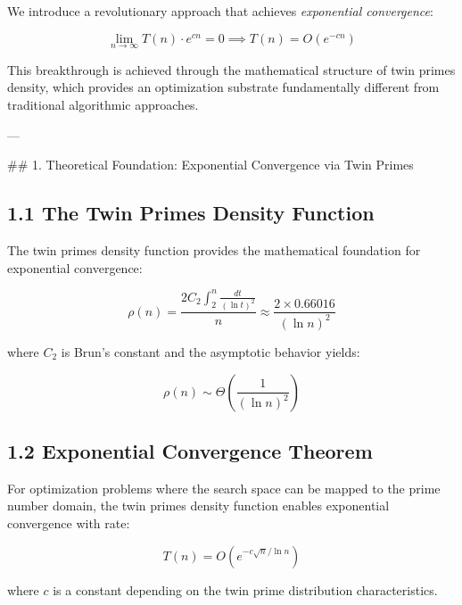 \documentclass[12pt,a4paper]{article}
\begin{document}
We introduce a revolutionary approach that achieves \emph{exponential convergence}:

\[
\lim_{n \to \infty} T(n) \cdot e^{c n} = 0 \implies T(n) = O(e^{-c n})
\]

This breakthrough is achieved through the mathematical structure of twin primes density, which provides an optimization substrate fundamentally different from traditional algorithmic approaches.

---

## 1. Theoretical Foundation: Exponential Convergence via Twin Primes

\subsection{1.1 The Twin Primes Density Function}

The twin primes density function provides the mathematical foundation for exponential convergence:

\[
\rho(n) = \frac{2C_2 \int_2^n \frac{dt}{(\ln t)^2}}{n} \approx \frac{2 \times 0.66016}{(\ln n)^2}
\]

where $C_2$ is Brun's constant and the asymptotic behavior yields:

\[
\rho(n) \sim \Theta\left(\frac{1}{(\ln n)^2}\right)
\]

\subsection{1.2 Exponential Convergence Theorem}

\begin{theorem}
For optimization problems where the search space can be mapped to the prime number domain, the twin primes density function enables exponential convergence with rate:

\[
T(n) = O\left(e^{-c \sqrt{n} / \ln n}\right)
\]

where $c$ is a constant depending on the twin prime distribution characteristics.
\end{theorem}
\end{document}
